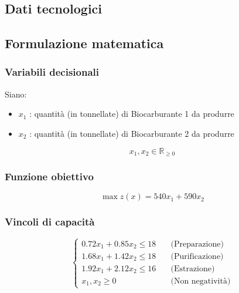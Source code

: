 \subsection{Dati tecnologici}
\begin{table}[h]
\centering
{}
\end{table}

\subsection{Formulazione matematica}

\subsubsection{Variabili decisionali}
Siano:
\begin{itemize}
    \item $x_1$ : quantità (in tonnellate) di Biocarburante 1 da produrre
    \item $x_2$ : quantità (in tonnellate) di Biocarburante 2 da produrre
\end{itemize}
\begin{equation}
x_1, x_2 \in \mathbb{R}_{\geq 0}
\end{equation}

\subsubsection{Funzione obiettivo}
\begin{equation}
\max z(x) = 540x_1 + 590x_2
\end{equation}

\subsubsection{Vincoli di capacità}
\[
\begin{cases}
0.72x_1 + 0.85x_2 \leq 18 \quad &\text{(Preparazione)} \\
1.68x_1 + 1.42x_2 \leq 18 \quad &\text{(Purificazione)} \\
1.92x_1 + 2.12x_2 \leq 16 \quad &\text{(Estrazione)} \\
x_1, x_2 \geq 0 \quad &\text{(Non negatività)}
\end{cases}
\]

